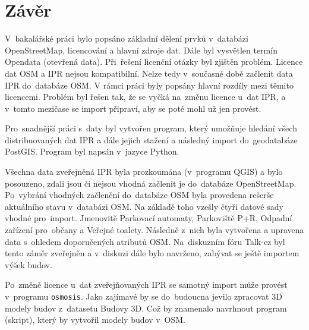 \chapter{Závěr}
\label{5-zaver}

V~bakalářské práci bylo popsáno základní dělení prvků v~databázi
OpenStreetMap, licencování a hlavní zdroje dat. Dále byl vysvětlen termín
Opendata (otevřená data).
Při~řešení licenční otázky byl zjištěn problém. Licence dat
OSM a IPR nejsou kompatibilní. Nelze tedy v~současné době začlenit
data IPR do~databáze OSM. V rámci práci byly popsány hlavní rozdíly mezi těmito licencemi.
Problém byl řešen tak, že se vyčká na~změnu licence u~dat IPR, a
v~tomto mezičase se import připraví, aby se poté mohl už jen provést.


Pro~snadnější práci s~daty byl vytvořen program, který umožňuje hledání
všech distribuovaných dat IPR a dále jejich stažení a
následný import do~geodatabáze PostGIS. Program byl napsán v~jazyce
Python.


Všechna data zveřejněná IPR byla prozkoumána (v~programu QGIS)
a bylo posouzeno, zdali jsou či nejsou vhodná začlenit je do~databáze
OpenStreetMap. Po~vybrání vhodných začlenění do~databáze OSM byla
provedena rešerše aktuálního stavu v~databázi OSM.
Na základě toho vzešly čtyři datové sady vhodné pro~import.
Jmenovitě Parkovací automaty, Parkoviště P+R, Odpadní zařízení
pro~občany a Veřejné toalety. Následně z~nich byla vytvořena a upravena
data s~ohledem doporučených atributů OSM.
Na~diskuzním fóru Talk-cz byl tento záměr zveřejněn a v~diskuzi dále bylo
navrženo, zabývat se ještě importem výšek budov.


Po~změně licence u~dat zveřejňovaných IPR se samotný import může provést
v~programu {\tt osmosis}.
Jako zajímavé by se do~budoucna jevilo zpracovat 3D modely budov
z~datasetu Budovy 3D. Což by znamenalo navrhnout program (skript), který by vytvořil
modely budov v~OSM.
